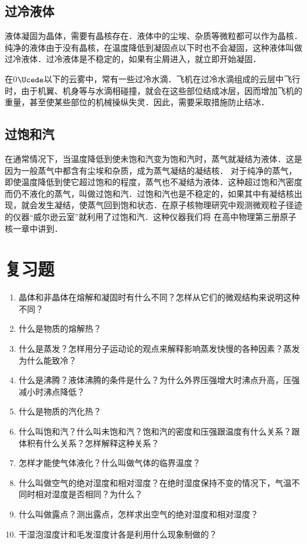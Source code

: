 \subsection*{过冷液体} 
液体凝固为晶体，需要有晶核存在．液体中的尘埃、杂质等微粒都可以作为晶核．
纯净的液体由于没有晶核，在温度降低到凝固点以下时也不会凝固，这种液体叫做过冷液体．过冷液体是不稳定的，如果有尘屑进入，就立即开始凝固．

在0$\Ucede$以下的云雾中，常有一些过冷水滴．飞机在过冷水滴组成的云层中飞行时，由于机翼、机身等与水滴相碰撞，就会在这些部位结成冰层，因而增加飞机的重量，甚至使某些部位的机械操纵失灵．因此，需要采取措施防止结冰．

\subsection*{过饱和汽} 
在通常情况下，当温度降低到使未饱和汽变为饱和汽时，蒸气就凝结为液体．这是因为一般蒸气中都含有尘埃和杂质，成为蒸气凝结的凝结核．
对于纯净的蒸气，即使温度降低到使它超过饱和的程度，蒸气也不凝结为液体．这种超过饱和汽密度而仍不液化的蒸气，叫做过饱和汽．过饱和汽也是不稳定的，如果其中有凝结核出现，就会发生凝结，使蒸气回到饱和状态．在原子核物理研究中观测微观粒子径迹的仪器“威尔逊云室”就利用了过饱和汽．这种仪器我们将
在高中物理第三册原子核一章中讲到．


\section*{复习题}
\begin{enumerate}
    \item 晶体和非晶体在熔解和凝固时有什么不同？怎样从它们的微观结构来说明这种不同？
    \item 什么是物质的熔解热？
    \item 什么是蒸发？怎样用分子运动论的观点来解释影响蒸发快慢的各种因素？蒸发为什么能致冷？
    \item 什么是沸腾？液体沸腾的条件是什么？为什么外界压强增大时沸点升高，压强减小时沸点降低？
    \item 什么是物质的汽化热？
    \item 什么叫饱和汽？什么叫未饱和汽？饱和汽的密度和压强跟温度有什么关系？跟体积有什么关系？怎样解释这种关系？
    \item 怎样才能使气体液化？什么叫做气体的临界温度？
    \item 什么叫做空气的绝对湿度和相对湿度？在绝时湿度保持不变的情况下，气温不同时相对湿度是否相同？为什么？
    \item 什么叫做露点？测出露点，怎样求出空气的绝对湿度和相对湿度？
    \item 干湿泡湿度计和毛发湿度计各是利用什么现象制做的？
\end{enumerate}


